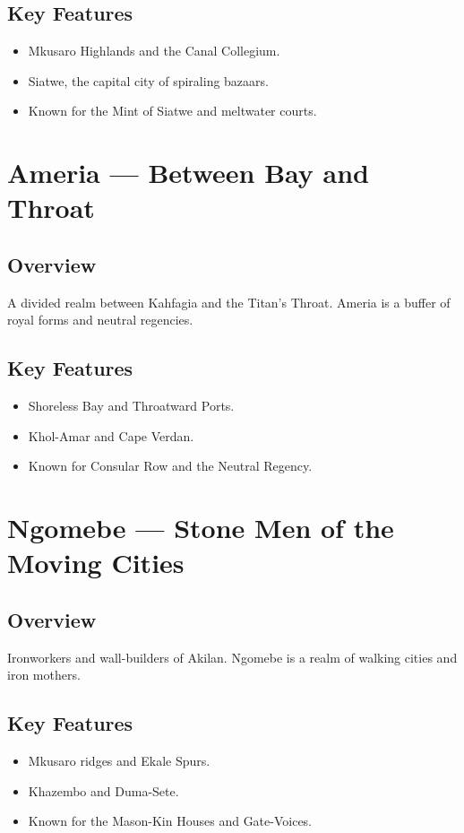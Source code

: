 \subsection*{Key Features}
\begin{itemize}[leftmargin=*]
    \item Mkusaro Highlands and the Canal Collegium.
    \item Siatwe, the capital city of spiraling bazaars.
    \item Known for the Mint of Siatwe and meltwater courts.
\end{itemize}

\section{Ameria — Between Bay and Throat}
\label{sec:lore-america}

\subsection*{Overview}
A divided realm between Kahfagia and the Titan’s Throat. Ameria is a buffer of royal forms and neutral regencies.

\subsection*{Key Features}
\begin{itemize}[leftmargin=*]
    \item Shoreless Bay and Throatward Ports.
    \item Khol-Amar and Cape Verdan.
    \item Known for Consular Row and the Neutral Regency.
\end{itemize}

\section{Ngomebe — Stone Men of the Moving Cities}
\label{sec:lore-ngomebe}

\subsection*{Overview}
Ironworkers and wall-builders of Akilan. Ngomebe is a realm of walking cities and iron mothers.

\subsection*{Key Features}
\begin{itemize}[leftmargin=*]
    \item Mkusaro ridges and Ekale Spurs.
    \item Khazembo and Duma-Sete.
    \item Known for the Mason-Kin Houses and Gate-Voices.
\end{itemize}

